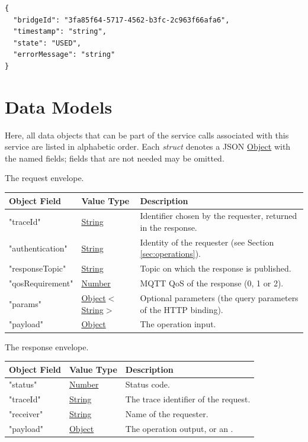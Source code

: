 \documentclass[a4paper]{arrowhead}
\newcommand{\mref}[2][]{{\textcolor{ArrowheadPurple}{\hyperref[sec:model:#2]{\ifstrempty{#1}{#2}{#1}}}}}
\newcommand{\oref}[1]{{\textcolor{ArrowheadBlue}{\hyperref[sec:operations:#1]{#1}}}}
\newcommand{\pref}[1]{{\textcolor{ArrowheadGrey}{\hyperref[sec:model:primitives:#1]{#1}}}}
\begin{document}
\begin{lstlisting}[caption={Payload of an \oref{report} request.}]
{
  "bridgeId": "3fa85f64-5717-4562-b3fc-2c963f66afa6",
  "timestamp": "string",
  "state": "USED",
  "errorMessage": "string"
}
\end{lstlisting}

\newpage

\section{Data Models}
\label{sec:model}

Here, all data objects that can be part of the service calls associated with this service are listed in alphabetic order.
Each \textit{struct} denotes a JSON \pref{Object} with the named fields; fields that are not needed may be omitted.


The request envelope.

\noindent\begin{tabularx}{\textwidth}{| p{4.25cm} | p{3.5cm} | X |} \hline
\rowcolor{gray!33} Object Field & Value Type & Description \\ \hline
"traceId" & \pref{String} & Identifier chosen by the requester, returned in the response. \\ \hline
"authentication" & \pref{String} & Identity of the requester (see Section \ref{sec:operations}). \\ \hline
"responseTopic" & \pref{String} & Topic on which the response is published. \\ \hline
"qosRequirement" & \pref{Number} & MQTT QoS of the response (0, 1 or 2). \\ \hline
"params" & \pref{Object}$<$\pref{String}$>$ & Optional parameters (the query parameters of the HTTP binding). \\ \hline
"payload" & \pref{Object} & The operation input. \\ \hline
\end{tabularx}


The response envelope.

\noindent\begin{tabularx}{\textwidth}{| p{4.25cm} | p{3.5cm} | X |} \hline
\rowcolor{gray!33} Object Field & Value Type & Description \\ \hline
"status" & \pref{Number} & Status code. \\ \hline
"traceId" & \pref{String} & The trace identifier of the request. \\ \hline
"receiver" & \pref{String} & Name of the requester. \\ \hline
"payload" & \pref{Object} & The operation output, or an \mref{ErrorMessage}. \\ \hline
\end{tabularx}
\end{document}
